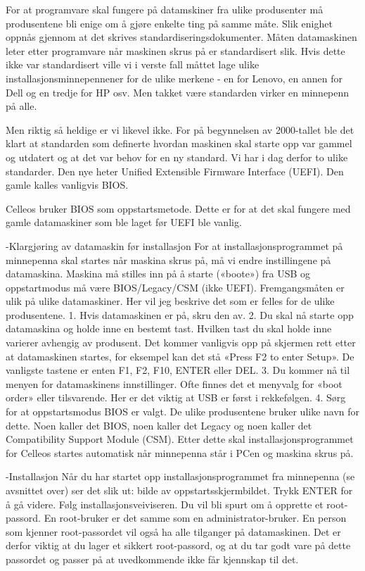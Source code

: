 For at programvare skal fungere på datamskiner fra ulike produsenter må produsentene bli enige om  å gjøre enkelte ting på samme måte. Slik enighet oppnås gjennom at det skrives standardiseringsdokumenter. Måten datamaskinen leter etter programvare når maskinen skrus på er standardisert slik. Hvis dette ikke var standardisert ville vi i verste fall måttet lage ulike installasjonsminnepennener for de ulike merkene - en for Lenovo, en annen for Dell og  en tredje for HP osv. Men takket være standarden virker en minnepenn på alle.

Men riktig så heldige er vi likevel ikke. For på begynnelsen av 2000-tallet ble det klart at standarden som definerte hvordan maskinen skal starte opp var gammel og utdatert og at det var behov for en ny standard. Vi har i dag derfor to ulike standarder. Den nye heter Unified Extensible Firmware Interface (UEFI). Den gamle kalles vanligvis BIOS. 

Celleos bruker BIOS som oppstartsmetode. Dette er for at det skal fungere med gamle datamaskiner som ble laget før UEFI ble vanlig. 

-Klargjøring av datamaskin før installasjon
For at installasjonsprogrammet på minnepenna skal startes når maskina skrus på, må vi endre instillingene på datamaskina. Maskina må stilles inn på å starte («boote») fra USB og oppstartmodus må være BIOS/Legacy/CSM (ikke UEFI). Fremgangsmåten er ulik på ulike datamaskiner. Her vil jeg beskrive det som er felles for de ulike produsentene. 
1.	Hvis datamaskinen er på, skru den av.
2.	Du skal nå starte opp datamaskina og holde inne en bestemt tast. Hvilken tast du skal holde inne varierer avhengig av produsent. Det kommer vanligvis opp på skjermen rett etter at datamaskinen startes, for eksempel kan det stå «Press F2 to enter Setup». De vanligste tastene er enten F1, F2, F10, ENTER eller DEL.
3.	Du kommer nå til menyen for datamaskinens innstillinger. Ofte finnes det et menyvalg for «boot order» eller tilsvarende. Her er det viktig at USB er først i rekkefølgen.
4.	Sørg for at oppstartsmodus BIOS er valgt. De ulike produsentene bruker ulike navn for dette. Noen kaller det BIOS, noen kaller det Legacy og noen kaller det Compatibility Support Module (CSM). 
Etter dette skal installasjonsprogrammet for Celleos startes automatisk når minnepenna står i PCen og maskina skrus på.


-Installasjon
Når du har startet opp installasjonsprogrammet fra minnepenna (se avsnittet over) ser det slik ut:
bilde av oppstartsskjermbildet.
Trykk ENTER for å gå videre.
Følg installasjonsveiviseren. Du vil bli spurt om å opprette et root-passord. En root-bruker er det samme som en administrator-bruker. En person som kjenner root-passordet vil også ha alle tilganger på datamaskinen. Det er derfor viktig at du lager et sikkert root-passord, og at du tar godt vare på dette passordet og passer på at uvedkommende ikke får kjennskap til det. 

